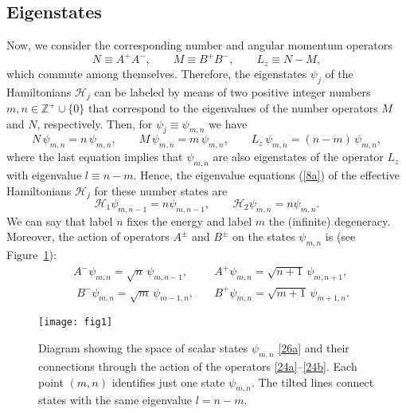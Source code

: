 \documentclass[aps,showpacs,showkeys]{revtex4}
\begin{document}
\subsection{Eigenstates}\label{sec2.2}
Now, we consider the corresponding number and angular momentum operators
\begin{equation}\label{22}
N\equiv A^+A^-, \qquad M\equiv B^+B^-, \qquad L_z\equiv N-M,
\end{equation}
which commute among themselves. Therefore, the eigenstates $\psi_j$ of the Hamiltonians $\mathcal{H}_j$ can be labeled by means of two positive integer numbers $m,n\in\mathbb{Z}^+\cup\{0\}$ that correspond to the eigenvalues of the number operators $M$ and $N$, respectively. Then, for $\psi_j\equiv\psi_{m,n}$ we have
\begin{equation}\label{23}
  N\,\psi_{m,n}=n\,\psi_{m,n}, \qquad M\,\psi_{m,n}=m\,\psi_{m,n}, \qquad L_z\,\psi_{m,n}=(n-m)\,\psi_{m,n},
\end{equation}
where the last equation implies that $\psi_{m,n}$ are also eigenstates of the operator $L_z$ with eigenvalue $l\equiv n-m$. Hence, the eigenvalue equations (\ref{8a}) of the effective Hamiltonians $\mathcal{H}_{j}$ for these number states are
\begin{equation}\label{26a}
\mathcal{H}_{1}\psi_{m,n-1}=n\psi_{m,n-1}, \qquad \mathcal{H}_{2}\psi_{m,n}=n\psi_{m,n}.
\end{equation} 
We can say that label $n$ fixes the energy and label $m$ the (infinite) degeneracy. Moreover, the action of  operators $A^\pm$ and $B^\pm$ on the states $\psi_{m,n}$ is (see Figure~\ref{fig:diagram}):
	\begin{eqnarray}
	&A^-\psi_{m,n}=\sqrt{n}\,\psi_{m,n-1}, \quad& A^+\psi_{m,n}=\sqrt{n+1}\,\psi_{m,n+1}, \label{24a}\\
	&\;B^-\psi_{m,n}=\sqrt{m}\,\psi_{m-1,n}, \quad& B^+\psi_{m,n}=\sqrt{m+1}\,\psi_{m+1,n}. \label{24b}
	\end{eqnarray}

\begin{figure}[htb]
	\centering
	\texttt{[image: fig1]}
	\caption{\label{fig:diagram}Diagram showing the space of scalar states $\psi_{m,n}$ \eqref{26a} and their connections through the action of the operators \eqref{24a}--\eqref{24b}. Each point $(m,n)$ identifies just one state $\psi_{m,n}$. The tilted lines connect states with the same eigenvalue $l=n-m$.}
\end{figure}
\end{document}
